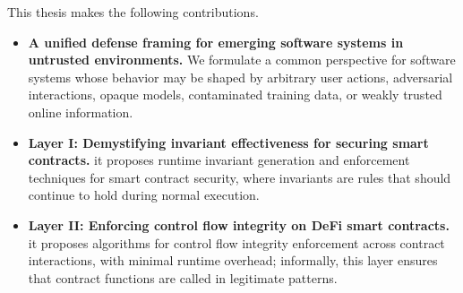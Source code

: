 This thesis makes the following contributions.
\begin{itemize}
    \item \textbf{A unified defense framing for emerging software 
    systems in untrusted environments.}
    We formulate a common perspective for software systems whose behavior 
    may be shaped by arbitrary user actions,
    adversarial interactions, opaque models, contaminated training data, 
    or weakly trusted online information.





    \item \noindent \textbf{Layer I: Demystifying invariant effectiveness for securing smart contracts.}
    it proposes runtime invariant generation  and enforcement techniques
    for smart contract security, where invariants are rules that 
    should continue to hold during normal execution.

    \item \noindent \textbf{Layer II: Enforcing control flow integrity on DeFi smart contracts.}
    it proposes algorithms for control flow integrity 
    enforcement across contract interactions, 
    with minimal runtime overhead; informally, 
    this layer ensures that contract functions are called 
    in legitimate patterns.


\end{itemize}
